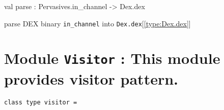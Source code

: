 \documentclass[11pt]{article}
\begin{document}
\ocamldocvspace{0.5cm}



\label{val:Parse.parse}\begin{ocamldoccode}
val parse : Pervasives.in_channel -> Dex.dex
\end{ocamldoccode}
\begin{ocamldocdescription}
parse DEX binary {\tt{in\_channel}} into {\tt{Dex.dex}}[\ref{type:Dex.dex}]


\end{ocamldocdescription}


\section{Module {\tt{Visitor}} : This module provides visitor pattern.}
\label{module:Visitor}




\ocamldocvspace{0.5cm}



\begin{ocamldoccode}
{\tt{class type visitor = }}\end{ocamldoccode}
\label{classtype:Visitor.visitor}
\end{document}
